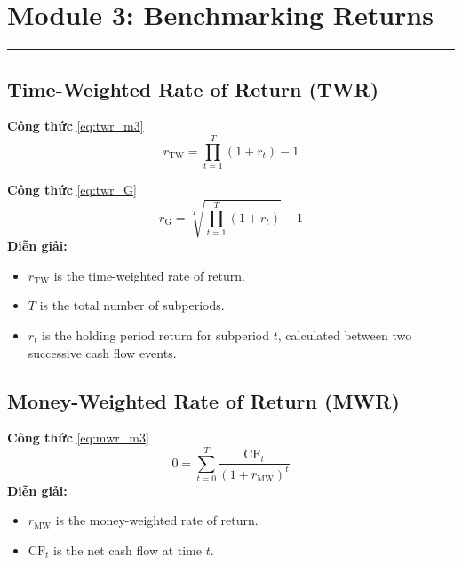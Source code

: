 \section*{Module 3: Benchmarking Returns}
\hrule
\vspace{0.8em}
\subsection*{Time-Weighted Rate of Return (TWR)}
\begin{tcolorbox}[colback=blue!3!white, colframe=trustvilleblue!80!black, boxrule=0.5pt, arc=3pt, left=6pt, right=6pt, top=4pt, bottom=4pt, breakable]
\noindent\textbf{Công thức} \eqref{eq:twr_m3}
\vspace{-0.4em}
\[
r_{\text{TW}} = \prod_{t=1}^{T} (1 + r_t) - 1
\]
\end{tcolorbox}
\vspace{0.3em}
\begin{tcolorbox}[colback=blue!3!white, colframe=trustvilleblue!80!black, boxrule=0.5pt, arc=3pt, left=6pt, right=6pt, top=4pt, bottom=4pt, breakable]
\noindent\textbf{Công thức} \eqref{eq:twr_G}
\vspace{-0.4em}
\[
r_{\text{G}} = \sqrt[T]{\prod_{t=1}^{T} (1 + r_t)} - 1
\]
\noindent\textbf{Diễn giải:}
\begin{itemize}[leftmargin=1.5em, noitemsep, topsep=2pt, parsep=0pt]
  \item $r_{\text{TW}}$ is the time-weighted rate of return.
  \item $T$ is the total number of subperiods.
  \item $r_t$ is the holding period return for subperiod $t$, calculated between two successive cash flow events.
\end{itemize}
\end{tcolorbox}
\vspace{0.3em}
\subsection*{Money-Weighted Rate of Return (MWR)}
\begin{tcolorbox}[colback=blue!3!white, colframe=trustvilleblue!80!black, boxrule=0.5pt, arc=3pt, left=6pt, right=6pt, top=4pt, bottom=4pt, breakable]
\noindent\textbf{Công thức} \eqref{eq:mwr_m3}
\vspace{-0.4em}
\[
0 = \sum_{t=0}^{T} \frac{\text{CF}_t}{(1 + r_{\text{MW}})^t}
\]
\noindent\textbf{Diễn giải:}
\begin{itemize}[leftmargin=1.5em, noitemsep, topsep=2pt, parsep=0pt]
  \item $r_{\text{MW}}$ is the money-weighted rate of return.
  \item $\text{CF}_t$ is the net cash flow at time $t$.
\end{itemize}
\end{tcolorbox}
\vspace{0.3em}
